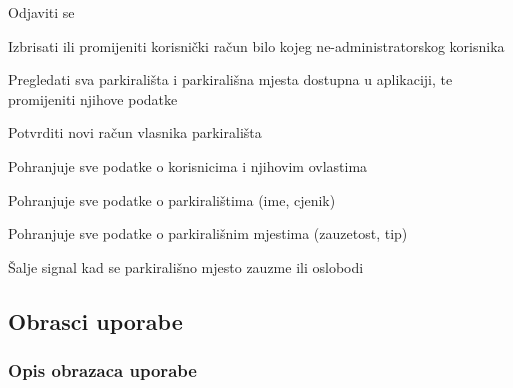 \begin{packed_enum}
\begin{packed_enum}
				\end{packed_enum}
			
				\item  {}
				
				\begin{packed_enum}
					
					\item Odjaviti se
					\item Izbrisati ili promijeniti korisnički račun bilo kojeg ne-administratorskog korisnika
					\item Pregledati sva parkirališta i parkirališna mjesta dostupna u aplikaciji, te promijeniti njihove podatke
					\item Potvrditi novi račun vlasnika parkirališta
					
				\end{packed_enum}
			
				\item  {}
				
				\begin{packed_enum}
					
					\item Pohranjuje sve podatke o korisnicima i njihovim ovlastima
					\item Pohranjuje sve podatke o parkiralištima (ime, cjenik)
					\item Pohranjuje sve podatke o parkirališnim mjestima (zauzetost, tip)
					
				\end{packed_enum}
			
				\item  {}
				
				\begin{packed_enum}
					
					\item Šalje signal kad se parkirališno mjesto zauzme ili oslobodi
					
				\end{packed_enum}
			\end{packed_enum}
			
			\eject 
			
			
				
			\subsection{Obrasci uporabe}
				
				\subsubsection{Opis obrazaca uporabe}
			
